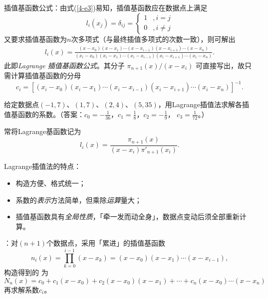 \entry 插值基函数公式：由式(\ref{4-e3})易知，插值基函数应在数据点上满足
\begin{equation}
l_i(x_j)=\delta_{ij}=\begin{cases}1&,i=j\\0&,i\neq j\end{cases}
\end{equation}
又要求插值基函数为$n$次多项式（与最终插值多项式的次数一致），则可解出
\begin{gather}
l_i(x)=\frac{(x-x_0)(x-x_1)\cdots(x-x_{i-1})(x-x_{i+1})\cdots(x-x_n)}{(x_i-x_0)
(x_i-x_1)\cdots(x_i-x_{i-1})(x_i-x_{i+1})\cdots(x_i-x_n)}.
\end{gather}
此即\emph{Lagrange 插值基函数公式}。其分子 $\pi_{n+1}(x)/(x-x_i)$ 可直接写出，故只需计算插值基函数的分母
\begin{equation}
c_i=\left[(x_i-x_0)(x_i-x_1)\cdots(x_i-x_{i-1})(x_i-x_{i+1})\cdots(x_i-x_n)\right]^{-1}.
\end{equation}

\example 给定数据点$(-1,7)$、$(1,7)$、$(2,4)$、$(5,35)$，用Lagrange插值法求解各插值基函数的系数。（答案：$c_0=-\frac1{36}$，$c_1=\frac18$，$c_2=-\frac19$，
$c_3=\frac1{72}$。）

\entry 常将Lagrange基函数记为
\begin{equation}
l_i(x)=\frac{\pi_{n+1}(x)}{(x-x_i)\pi'_{n+1}(x_i)}.
\end{equation}

\entry Lagrange插值法的特点：
\begin{itemize}\tl
    \item 构造方便、格式统一；
    \item 系数的\emph{表示}方法简单，但乘除\emph{运算}量大；
    \item 插值基函数具有\emph{全局性质}，「牵一发而动全身」，数据点变动后须全部重新计算。
\end{itemize}


\entry {}：对$(n+1)$个数据点，采用「累进」的插值基函数
\begin{equation}
n_i(x)=\prod_{k=0}^{i-1}(x-x_k)=(x-x_0)(x-x_1)\cdots(x-x_{i-1}),
\end{equation}
构造得到的 为
\begin{equation}\label{4-e4}
N_n(x)=c_0+c_1(x-x_0)+c_2(x-x_0)(x-x_1)+\cdots+c_n(x-x_0)\cdots(x-x_n)
\end{equation}
再求解系数$c_i$。

